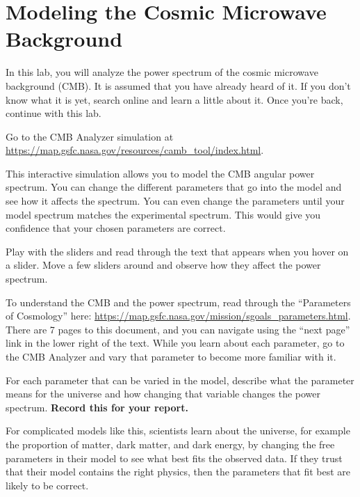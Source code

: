 \chapter{Modeling the Cosmic Microwave Background}


In this lab, you will analyze the power spectrum of the cosmic microwave background (CMB). It is assumed that you have already heard of it. If you don't know what it is yet, search online and learn a little about it. Once you're back, continue with this lab.

\begin{steps}
	\item Go to the CMB Analyzer simulation at \url{https://map.gsfc.nasa.gov/resources/camb_tool/index.html}.
\end{steps}

This interactive simulation allows you to model the CMB angular power spectrum. You can change the different parameters that go into the model and see how it affects the spectrum. You can even change the parameters until your model spectrum matches the experimental spectrum. This would give you confidence that your chosen parameters are correct.

\begin{steps}
	\item Play with the sliders and read through the text that appears when you hover on a slider. Move a few sliders around and observe how they affect the power spectrum.
	
	\item To understand the CMB and the power spectrum, read through the ``Parameters of Cosmology'' here: \url{https://map.gsfc.nasa.gov/mission/sgoals_parameters.html}. There are 7 pages to this document, and you can navigate using the ``next page'' link in the lower right of the text. While you learn about each parameter, go to the CMB Analyzer and vary that parameter to become more familiar with it.
	
	\item For each parameter that can be varied in the model, describe what the parameter means for the universe and how changing that variable changes the power spectrum. \textbf{Record this for your report.}
\end{steps}
	
For complicated models like this, scientists learn about the universe, for example the proportion of matter, dark matter, and dark energy, by changing the free parameters in their model to see what best fits the observed data. If they trust that their model contains the right physics, then the parameters that fit best are likely to be correct.

